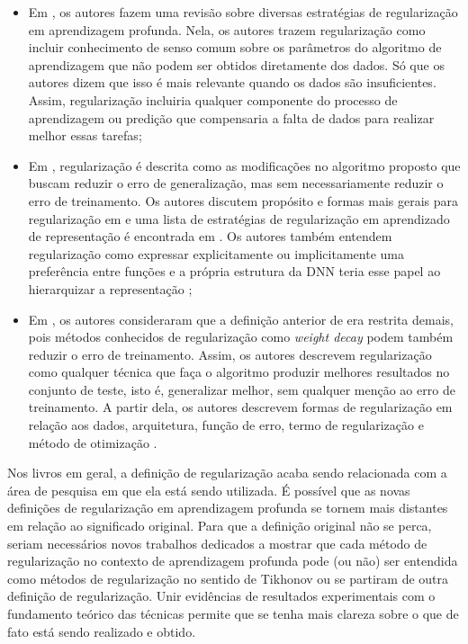 \begin{itemize}
\item Em \cite{Moradi2019}, os autores fazem uma revisão sobre diversas estratégias de regularização em aprendizagem profunda. Nela, os autores trazem regularização como incluir conhecimento de senso comum sobre os parâmetros do algoritmo de aprendizagem que não podem ser obtidos diretamente dos dados. Só que os autores dizem que isso é mais relevante quando os dados são insuficientes. Assim, regularização incluiria qualquer componente do processo de aprendizagem ou predição que compensaria a falta de dados para realizar melhor essas tarefas;
\item Em \cite[pág. 120]{goodfellow2016deep}, regularização é descrita como as modificações no algoritmo proposto que buscam reduzir o erro de generalização, mas sem necessariamente reduzir o erro de treinamento. Os autores discutem propósito e formas mais gerais para regularização em \cite[Capítulo 7]{goodfellow2016deep} e uma lista de estratégias de regularização em aprendizado de representação é encontrada em \cite[págs. 555-7]{goodfellow2016deep}. Os autores também entendem regularização como expressar explicitamente ou implicitamente uma preferência entre funções e a própria estrutura da DNN teria esse papel ao hierarquizar a representação \cite[págs. 120, 203, 505, 555]{goodfellow2016deep};
\item Em \cite{2017kukacka}, os autores consideraram que a definição anterior de \cite[pág. 120]{goodfellow2016deep} era restrita demais, pois métodos conhecidos de regularização como \textit{weight decay} podem também reduzir o erro de treinamento. Assim, os autores descrevem regularização como qualquer técnica que faça o algoritmo produzir melhores resultados no conjunto de teste, isto é, generalizar melhor, sem qualquer menção ao erro de treinamento. A partir dela, os autores descrevem formas de regularização em relação aos dados, arquitetura, função de erro, termo de regularização e método de otimização \cite{2017kukacka}. 
\end{itemize}

Nos livros em geral, a definição de regularização acaba sendo relacionada com a área de pesquisa em que ela está sendo utilizada. É possível que as novas definições de regularização em aprendizagem profunda se tornem mais distantes em relação ao significado original. Para que a definição original não se perca, seriam necessários novos trabalhos dedicados a mostrar que cada método de regularização no contexto de aprendizagem profunda pode (ou não) ser entendida como métodos de regularização no sentido de Tikhonov ou se partiram de outra definição de regularização. Unir evidências de resultados experimentais com o fundamento teórico das técnicas permite que se tenha mais clareza sobre o que de fato está sendo realizado e obtido.


